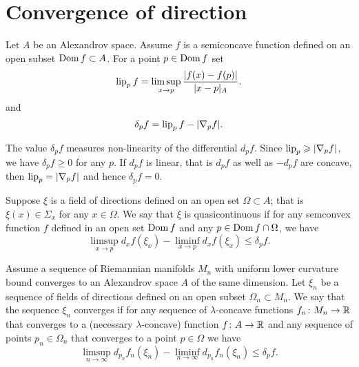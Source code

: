 \section{Convergence of direction}

Let $A$ be an Alexandrov space.
Assume $f$ is a semiconcave function defined on an open subset $\mathop{\rm Dom} f\subset A$.
For a point $p\in \mathop{\rm Dom} f$ set
\[\operatorname{\rm lip}_pf=\limsup_{x\to p} \frac{|f(x)-f(p)|}{|x-p|_A}.\]
and 
\[\delta_pf=\operatorname{\rm lip}_pf-|\nabla_p f|.\]

The value $\delta_pf$ measures non-linearity of the differential $d_pf$.
Since $\lip_p\zz\ge |\nabla_p f|$, we have $\delta_pf\ge 0$ for any $p$.
If $d_pf$ is linear, that is $d_pf$ as well as $-d_pf$ are concave,
then $\operatorname{\rm lip}_p= |\nabla_p f|$ and hence $\delta_pf=0$.

Suppose $\xi$ is a field of directions defined on an open set $\Omega\subset A$;
that is $\xi(x)\in\Sigma_x$ for any $x\in \Omega$.
We say that $\xi$ is quasicontinuous if for any semconvex function $f$ defined in an open set $\mathop{\rm Dom} f$ and any $p\in \mathop{\rm Dom} f\cap \Omega$, we have
\[\limsup_{x\to p} d_xf(\xi_x)-\liminf_{x\to p} d_xf(\xi_x)\le \delta_pf.\] 

Assume a sequence of Riemannian manifolds $M_n$ with uniform lower curvature bound converges to an Alexandrov space $A$ of the same dimension.
Let $\xi_n$ be a sequence of fields of directions defined on an open subset $\Omega_n\subset M_n$.
We say that the sequence $\xi_n$ converges if for any sequence of $\lambda$-concave functions $f_n\colon M_n\to \mathbb{R}$ that converges to a (necessary $\lambda$-concave) function $f\colon A\to \mathbb{R}$ and any sequence of points $p_n\in \Omega_n$ that converges to a point $p\in \Omega$ we have
\[\limsup_{n\to \infty} d_{p_n}f_n(\xi_n)-\liminf_{n\to \infty} d_{p_n}f_n(\xi_n)\le \delta_p f.\]

